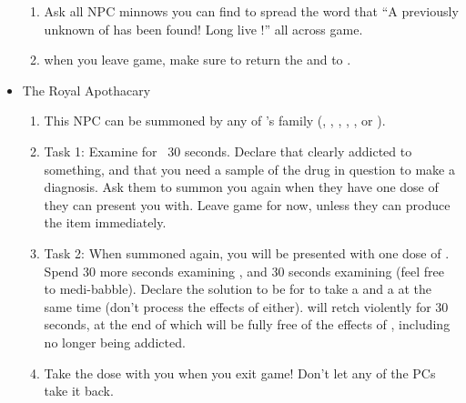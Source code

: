 \documentclass[green]{NeptuneBall}
\begin{document}
\begin{itemize}
\begin{enumerate}
		\item Ask all NPC minnows you can find to spread the word that ``A previously unknown \cManta{\prince} of \pAtlantis{} has been found! Long live \cManta{}!'' all across game.
		\item when you leave game, make sure to return the \iBirthCertificate{} and \iJournal{} to \cManta{}.
	\end{enumerate}
	\item The Royal Apothacary
	\begin{enumerate}
		\item This NPC can be summoned by any of \cWillow{}'s family (\cKing{}, \cAriel{}, \cPrincess{}, \cPlant{}, \cQueen{}, or \cManta{}).
		\item Task 1: Examine \cWillow{} for ~30 seconds. Declare that \cWillow{\they} \cWillow{\are} clearly addicted to something, and that you need a sample of the drug in question to make a diagnosis. Ask them to summon you again when they have one dose of \iDrug{} they can present you with. Leave game for now, unless they can produce the item immediately.
		\item Task 2: When summoned again, you will be presented with one dose of \iDrug{}. Spend 30 more seconds examining \cWillow{}, and 30 seconds examining \iDrug{} (feel free to medi-babble). Declare the solution to be for \cWillow{} to take a \iHealingPotion{} and a \iPoison{} at the same time (don't process the effects of either). \cWillow{\They} will retch violently for 30 seconds, at the end of which \cWillow{\they} will be fully free of the effects of \iDrug{}, including no longer being addicted.
		\item Take the \iDrug{} dose with you when you exit game! Don't let any of the PCs take it back.
	\end{enumerate}
\end{itemize}
\end{document}

